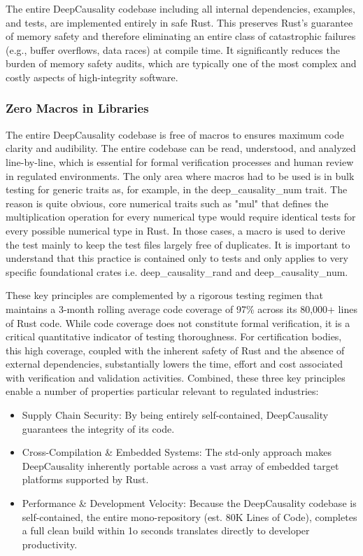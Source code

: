 The entire DeepCausality codebase including all internal dependencies, examples, and tests, are implemented entirely in safe Rust. This preserves Rust's guarantee of memory safety and therefore eliminating an entire class of catastrophic failures (e.g., buffer overflows, data races) at compile time. It significantly reduces the burden of memory safety audits, which are typically one of the most complex and costly aspects of high-integrity software.

\subsubsection{Zero Macros in Libraries}

The entire DeepCausality codebase is free of macros to ensures maximum code clarity and audibility. The entire codebase can be read, understood, and analyzed line-by-line, which is essential for formal verification processes and human review in regulated environments. The only area where macros had to be used is in bulk testing for generic traits as, for example, in the deep\_causality\_num trait. The reason is quite obvious, core numerical traits such as "mul" that defines the multiplication operation for every numerical type would require identical tests for every possible numerical type in Rust. In those cases, a macro is used to derive the test mainly to keep the test files largely free of duplicates. It is important to understand that this practice is contained only to tests and only applies to very specific foundational crates i.e. deep\_causality\_rand and deep\_causality\_num. 


These key principles are complemented by a rigorous testing regimen that maintains a 3-month rolling average code coverage of 97\% across its 80,000+ lines of Rust code. While code coverage does not constitute formal verification, it is a critical quantitative indicator of testing thoroughness. For certification bodies, this high coverage, coupled with the inherent safety of Rust and the absence of external dependencies, substantially lowers the time, effort and cost associated with verification and validation activities. Combined, these three key principles enable a number of properties particular relevant to regulated industries:

\begin{itemize}
	\item Supply Chain Security: By being entirely self-contained, DeepCausality guarantees the integrity of its code. 
	\item Cross-Compilation \& Embedded Systems: The std-only approach makes DeepCausality inherently portable across a vast array of embedded target platforms supported by Rust. 
	\item Performance \& Development Velocity: Because the DeepCausality codebase is self-contained, the entire mono-repository (est. 80K Lines of Code), completes a full clean build within 1o seconds translates directly to developer productivity. 
\end{itemize}

